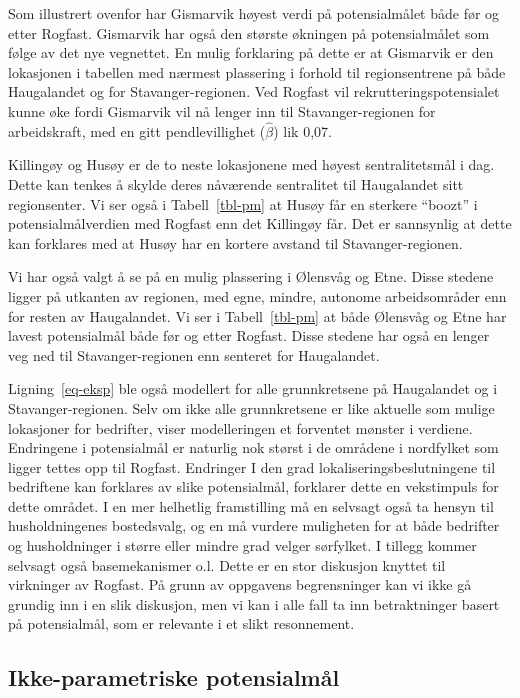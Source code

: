 \documentclass[
]{article}
\begin{document}
Som illustrert ovenfor har Gismarvik høyest verdi på potensialmålet både
før og etter Rogfast. Gismarvik har også den største økningen på
potensialmålet som følge av det nye vegnettet. En mulig forklaring på
dette er at Gismarvik er den lokasjonen i tabellen med nærmest
plassering i forhold til regionsentrene på både Haugalandet og for
Stavanger-regionen. Ved Rogfast vil rekrutteringspotensialet kunne øke
fordi Gismarvik vil nå lenger inn til Stavanger-regionen for
arbeidskraft, med en gitt pendlevillighet (\(\hat{\beta}\)) lik 0,07.

Killingøy og Husøy er de to neste lokasjonene med høyest sentralitetsmål
i dag. Dette kan tenkes å skylde deres nåværende sentralitet til
Haugalandet sitt regionsenter. Vi ser også i Tabell~\ref{tbl-pm} at
Husøy får en sterkere ``boozt'' i potensialmålverdien med Rogfast enn
det Killingøy får. Det er sannsynlig at dette kan forklares med at Husøy
har en kortere avstand til Stavanger-regionen.

Vi har også valgt å se på en mulig plassering i Ølensvåg og Etne. Disse
stedene ligger på utkanten av regionen, med egne, mindre, autonome
arbeidsområder enn for resten av Haugalandet. Vi ser i
Tabell~\ref{tbl-pm} at både Ølensvåg og Etne har lavest potensialmål
både før og etter Rogfast. Disse stedene har også en lenger veg ned til
Stavanger-regionen enn senteret for Haugalandet.

Ligning~\ref{eq-eksp} ble også modellert for alle grunnkretsene på
Haugalandet og i Stavanger-regionen. Selv om ikke alle grunnkretsene er
like aktuelle som mulige lokasjoner for bedrifter, viser modelleringen
et forventet mønster i verdiene. Endringene i potensialmål er naturlig
nok størst i de områdene i nordfylket som ligger tettes opp til Rogfast.
Endringer I den grad lokaliseringsbeslutningene til bedriftene kan
forklares av slike potensialmål, forklarer dette en vekstimpuls for
dette området. I en mer helhetlig framstilling må en selvsagt også ta
hensyn til husholdningenes bostedsvalg, og en må vurdere muligheten for
at både bedrifter og husholdninger i større eller mindre grad velger
sørfylket. I tillegg kommer selvsagt også basemekanismer o.l. Dette er
en stor diskusjon knyttet til virkninger av Rogfast. På grunn av
oppgavens begrensninger kan vi ikke gå grundig inn i en slik diskusjon,
men vi kan i alle fall ta inn betraktninger basert på potensialmål, som
er relevante i et slikt resonnement.

\hypertarget{ikke-parametriske-potensialmuxe5l}{%
\subsection{Ikke-parametriske
potensialmål}\label{ikke-parametriske-potensialmuxe5l}}
\end{document}
